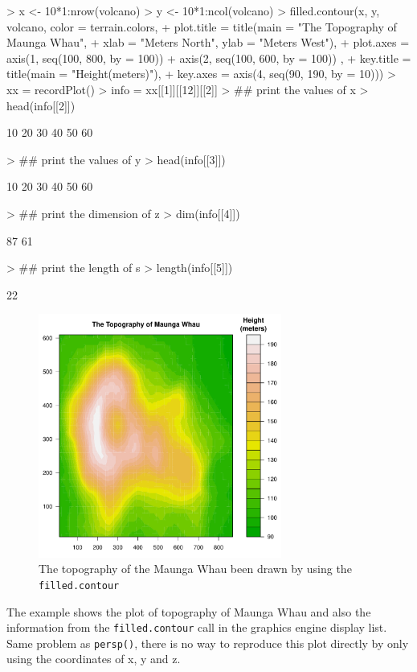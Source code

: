 \documentclass[paper=a4, fontsize=11pt]{report}
\begin{document}
\begin{Schunk}
\begin{Sinput}
> x <- 10*1:nrow(volcano)
> y <- 10*1:ncol(volcano)
> filled.contour(x, y, volcano, color = terrain.colors,
+     plot.title = title(main = "The Topography of Maunga Whau",
+     xlab = "Meters North", ylab = "Meters West"),
+     plot.axes = { axis(1, seq(100, 800, by = 100))
+                   axis(2, seq(100, 600, by = 100)) },
+     key.title = title(main = "Height\n(meters)"),
+     key.axes = axis(4, seq(90, 190, by = 10)))
> xx = recordPlot()
> info = xx[[1]][[12]][[2]]
> ## print the values of x
> head(info[[2]])
\end{Sinput}
\begin{Soutput}
[1] 10 20 30 40 50 60
\end{Soutput}
\begin{Sinput}
> ## print the values of y
> head(info[[3]])
\end{Sinput}
\begin{Soutput}
[1] 10 20 30 40 50 60
\end{Soutput}
\begin{Sinput}
> ## print the dimension of z
> dim(info[[4]])
\end{Sinput}
\begin{Soutput}
[1] 87 61
\end{Soutput}
\begin{Sinput}
> ## print the length of s
> length(info[[5]])
\end{Sinput}
\begin{Soutput}
[1] 22
\end{Soutput}
\end{Schunk}


\begin{figure}[h]
\begin{center}
  \includegraphics[height = 8cm, width = 8cm]{figure/filled_example_1.pdf}
  \caption{The topography of the Maunga Whau been drawn by using the \texttt{filled.contour}}
  	\label{figure8}
\end{center}
\end{figure}
The example shows the plot of topography of Maunga Whau and also the information from the \texttt{filled.contour} call in the graphics engine display list. Same problem as \texttt{persp()}, there is no way to reproduce this plot directly by only using the coordinates of x, y and z.\\
\end{document}
